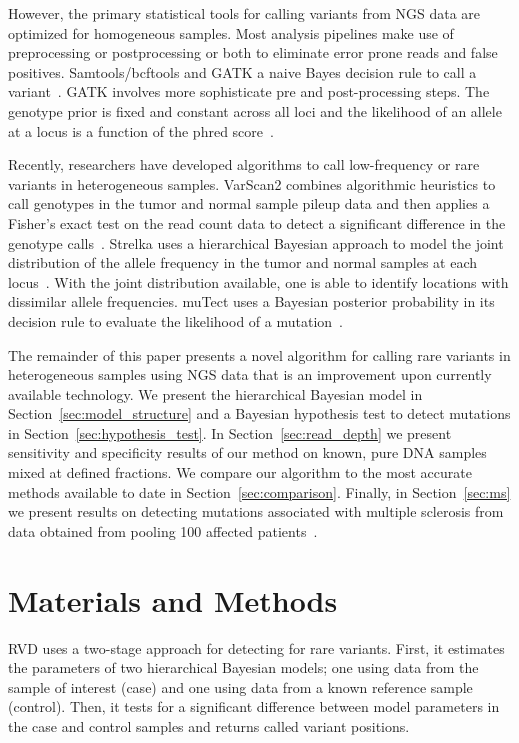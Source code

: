 \documentclass[11pt,reqno]{amsart}
\begin{document}
However, the primary statistical tools for calling variants from NGS data are optimized for homogeneous samples. Most analysis pipelines make use of preprocessing or postprocessing or both to eliminate error prone reads and false positives. Samtools/bcftools and GATK a naive Bayes decision rule to call a variant~\citep{}. GATK involves more sophisticate pre and post-processing steps. The genotype prior is fixed and constant across all loci and the likelihood of an allele at a locus is a function of the phred score~\citep{McKenna:2010bv}.

Recently, researchers have developed algorithms to call low-frequency or rare variants in heterogeneous samples.  VarScan2 combines algorithmic heuristics to call genotypes in the tumor and normal sample pileup data and then applies a Fisher's exact test on the read count data to detect a significant difference in the genotype calls~\citep{Koboldt:2012cg}. Strelka uses a hierarchical Bayesian approach to model the joint distribution of the allele frequency in the tumor and normal samples at each locus~\citep{Saunders:2012fh}. With the joint distribution available, one is able to identify locations with dissimilar allele frequencies. muTect uses a Bayesian posterior probability in its decision rule to evaluate the likelihood of a mutation~\citep{Cibulskis:2013ta}.

The remainder of this paper presents a novel algorithm for calling rare variants in heterogeneous samples using NGS data that is an improvement upon currently available technology. We present the hierarchical Bayesian model in Section~\ref{sec:model_structure} and a Bayesian hypothesis test to detect mutations in Section~\ref{sec:hypothesis_test}. In Section~\ref{sec:read_depth} we present sensitivity and specificity results of our method on known, pure DNA samples mixed at defined fractions. We compare our algorithm to the most accurate methods available to date in Section~\ref{sec:comparison}. Finally, in Section~\ref{sec:ms} we present results on detecting mutations associated with multiple sclerosis from data obtained from pooling 100 affected patients~\citep{Ferretti:2013hp}.

\section{Materials and Methods}

RVD uses a two-stage approach for detecting for rare variants. First, it estimates the parameters of two hierarchical Bayesian models; one using data from the sample of interest (case) and one using data from a known reference sample (control). Then, it tests for a significant difference between model parameters in the case and control samples and returns called variant positions.
\end{document}
